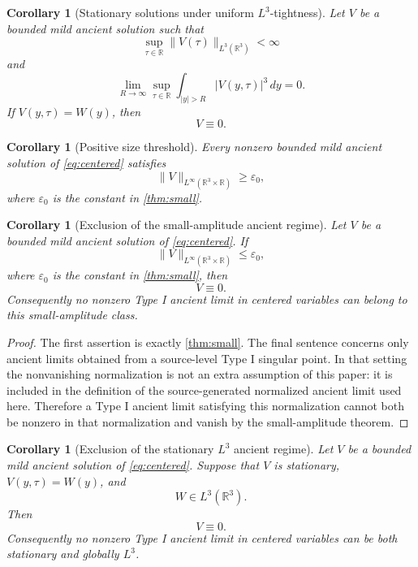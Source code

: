 \documentclass[11pt]{amsart}
\theoremstyle{plain}
\newtheorem{corollary}[theorem]{Corollary}
\theoremstyle{definition}
\theoremstyle{remark}
\numberwithin{equation}{section}
\begin{document}
\begin{corollary}[Stationary solutions under uniform \(L^3\)-tightness]\label{cor:stationary-tight}
Let \(V\) be a bounded mild ancient solution such that
\[
   \sup_{\tau\in\mathbb R}\|V(\tau)\|_{L^3(\mathbb R^3)}<\infty
\]
and
\[
   \lim_{R\to\infty}
   \sup_{\tau\in\mathbb R}
   \int_{|y|>R}|V(y,\tau)|^3\,dy=0.
\]
If \(V(y,\tau)=W(y)\), then
\[
   V\equiv0.
\]
\end{corollary}

\begin{corollary}[Positive size threshold]\label{cor:size-threshold}
Every nonzero bounded mild ancient solution of \eqref{eq:centered} satisfies
\[
   \|V\|_{L^\infty(\mathbb R^3\times\mathbb R)}\ge \varepsilon_0,
\]
where \(\varepsilon_0\) is the constant in \cref{thm:small}.
\end{corollary}

\begin{corollary}[Exclusion of the small-amplitude ancient regime]\label{cor:small-branch}
Let \(V\) be a bounded mild ancient solution of \eqref{eq:centered}.  If
\[
   \|V\|_{L^\infty(\mathbb R^3\times\mathbb R)}\le\varepsilon_0,
\]
where \(\varepsilon_0\) is the constant in \cref{thm:small}, then
\[
   V\equiv0.
\]
Consequently no nonzero Type I ancient limit in centered variables can belong
to this small-amplitude class.
\end{corollary}

\begin{proof}
The first assertion is exactly \cref{thm:small}.  The final sentence concerns
only ancient limits obtained from a source-level Type I singular point.  In
that setting the nonvanishing normalization is not an extra assumption of this
paper: it is included in the definition of the source-generated normalized
ancient limit used here.  Therefore a Type I ancient limit satisfying this
normalization cannot both be nonzero in that normalization and vanish by the
small-amplitude theorem.
\end{proof}

\begin{corollary}[Exclusion of the stationary \(L^3\) ancient regime]\label{cor:stationary-L3-branch}
Let \(V\) be a bounded mild ancient solution of \eqref{eq:centered}.  Suppose
that \(V\) is stationary, \(V(y,\tau)=W(y)\), and
\[
   W\in L^3(\mathbb R^3).
\]
Then
\[
   V\equiv0.
\]
Consequently no nonzero Type I ancient limit in centered variables can be both
stationary and globally \(L^3\).
\end{corollary}
\end{document}
